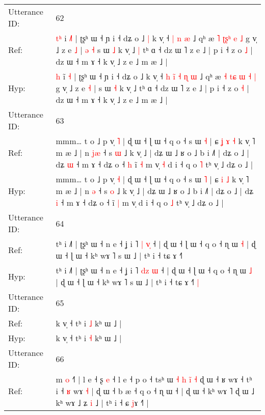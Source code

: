 \documentclass[10pt]{article}
\DeclareRobustCommand{\hl}[1]{{\textcolor{red}{#1}}}
\begin{document}
\begin{longtable}{ll}
 \\
\midrule
Utterance ID: & 62 \\
Ref: & \hl{t}\hl{ʰ} i\hl{ }\hl{˩}\hl{˥} | ʈʂʰ ɯ ˧ ɲ i ˧ dʑ o ˩\hl{ }\hl{|} k v̩ ˧\hl{}\hl{}\hl{}\hl{}\hl{} \hl{|} \hl{n} \hl{æ} ˩ qʰ æ \hl{˥} \hl{}\hl{ʈ}\hl{ʂ}\hl{ʰ} \hl{e} \hl{˩} g v̩ ˩ z e \hl{˩} |\hl{ }\hl{ə}\hl{ }\hl{˧} s ɯ \hl{˩} k v̩ ˩\hl{ }\hl{|} tʰ ɑ ˧ dz ɯ ˥ z e ˩ | p i ˧ z o \hl{˩} | dz ɯ ˧ m ɤ ˧ k v̩ ˩ z e ˩ m æ ˩ |
 \\
Hyp: & \hl{}\hl{h} i\hl{̃}\hl{ }\hl{˧} | ʈʂʰ ɯ ˧ ɲ i ˧ dʑ o ˩\hl{}\hl{} k v̩ ˧\hl{ }\hl{h}\hl{ }\hl{i}\hl{̃} \hl{˧} \hl{ɳ} \hl{ɯ} ˩ qʰ æ \hl{˧} \hl{t}\hl{ɕ}\hl{ }\hl{ɯ} \hl{˧} \hl{|} g v̩ ˩ z e \hl{˧} |\hl{}\hl{}\hl{}\hl{} s ɯ \hl{˧} k v̩ ˩\hl{}\hl{} tʰ ɑ ˧ dz ɯ ˥ z e ˩ | p i ˧ z o \hl{˧} | dz ɯ ˧ m ɤ ˧ k v̩ ˩ z e ˩ m æ ˩ |
 \\
\midrule
Utterance ID: & 63 \\
Ref: & mmm… t o ˩ p v̩ \hl{˥} | ɖ ɯ ˧ ɭ ɯ ˧ q o ˧ s ɯ \hl{˧} | ɕ\hl{ }\hl{ʝ} \hl{ɤ} \hl{˧} k v̩ ˥ m æ ˩ | n \hl{j}\hl{æ} ˧ s \hl{ɯ} ˩ k v̩ ˩ | dʑ ɯ ˩ ʁ o ˩ b i ˩˥ | dʑ o ˩ | dʑ \hl{ɯ} ˧ m ɤ ˧ dʑ o ˧\hl{ }\hl{h} ĩ \hl{˧} m v̩\hl{ }\hl{˧} d i ˧ q o \hl{˥} tʰ v̩ ˩ dʑ o ˩ |
 \\
Hyp: & mmm… t o ˩ p v̩ \hl{˧} | ɖ ɯ ˧ ɭ ɯ ˧ q o ˧ s ɯ \hl{˥} | ɕ\hl{}\hl{} \hl{i} \hl{˩} k v̩ ˥ m æ ˩ | n \hl{}\hl{ə} ˧ s \hl{o} ˩ k v̩ ˩ | dʑ ɯ ˩ ʁ o ˩ b i ˩˥ | dʑ o ˩ | dʑ \hl{i} ˧ m ɤ ˧ dʑ o ˧\hl{}\hl{} ĩ \hl{|} m v̩\hl{}\hl{} d i ˧ q o \hl{˩} tʰ v̩ ˩ dʑ o ˩ |
 \\
\midrule
Utterance ID: & 64 \\
Ref: & tʰ i ˩˥ | ʈʂʰ ɯ ˧ n e ˧ ʝ i ˥ \hl{|}\hl{ }\hl{v}\hl{̩} ˧ | ɖ ɯ ˧ ɭ ɯ ˧ q o ˧ ɳ ɯ \hl{˧} | ɖ ɯ ˧ ɭ ɯ ˧ kʰ wɤ ˥ s ɯ ˩ | tʰ i ˧ tɕ ɤ ˧˥\hl{}\hl{}
 \\
Hyp: & tʰ i ˩˥ | ʈʂʰ ɯ ˧ n e ˧ ʝ i ˥ \hl{d}\hl{z}\hl{ }\hl{ɯ} ˧ | ɖ ɯ ˧ ɭ ɯ ˧ q o ˧ ɳ ɯ \hl{˩} | ɖ ɯ ˧ ɭ ɯ ˧ kʰ wɤ ˥ s ɯ ˩ | tʰ i ˧ tɕ ɤ ˧˥\hl{ }\hl{|}
 \\
\midrule
Utterance ID: & 65 \\
Ref: & k v̩ ˧ tʰ i \hl{˩} kʰ ɯ ˩ |
 \\
Hyp: & k v̩ ˧ tʰ i \hl{˧} kʰ ɯ ˩ |
 \\
\midrule
Utterance ID: & 66 \\
Ref: & m \hl{o} ˧\hl{˥} | l e ˧ ʂ \hl{e} ˧ l e ˧ p o ˧ tsʰ ɯ\hl{ }\hl{˧} \hl{h} \hl{i}\hl{̃} \hl{˧} ɖ ɯ ˧ ʁ wɤ ˧ tʰ i ˧ \hl{ʁ} wɤ \hl{}\hl{˧} | ɖ ɯ ˧ b æ ˧ q o ˧ ɳ ɯ ˧ | ɖ ɯ ˧ kʰ wɤ ˥ ɖ ɯ ˩ kʰ wɤ ˩ \hl{}ʑ \hl{i} ˩ | tʰ i ˧ \hl{}ɕ \hl{j}ɤ ˧˥ |
 \\

\end{longtable}
\end{document}
